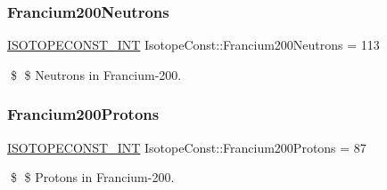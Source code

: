 \subsubsection{\texorpdfstring{Francium200\+Neutrons}{Francium200Neutrons}}
{\footnotesize\ttfamily \mbox{\hyperlink{group___isotope_const-_macros_ga5f18360b3e99483a35c32d789e62621c}{I\+S\+O\+T\+O\+P\+E\+C\+O\+N\+S\+T\+\_\+\+I\+NT}} Isotope\+Const\+::\+Francium200\+Neutrons = 113}

\$ \$ Neutrons in Francium-\/200. \mbox{\label{group___isotope_const-_francium-_fr200_gad58453437e0e7631fad7127e9960669c}} 
\subsubsection{\texorpdfstring{Francium200\+Protons}{Francium200Protons}}
{\footnotesize\ttfamily \mbox{\hyperlink{group___isotope_const-_macros_ga5f18360b3e99483a35c32d789e62621c}{I\+S\+O\+T\+O\+P\+E\+C\+O\+N\+S\+T\+\_\+\+I\+NT}} Isotope\+Const\+::\+Francium200\+Protons = 87}

\$ \$ Protons in Francium-\/200. 